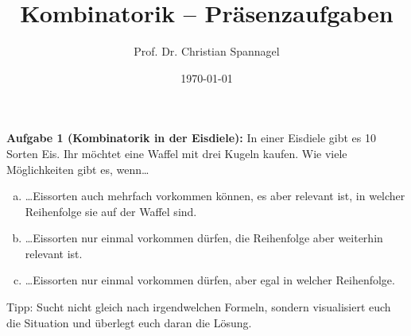 \documentclass{../cssheet}
\title{Kombinatorik -- Präsenzaufgaben}
\author{Prof. Dr. Christian Spannagel}
\date{\today}
\begin{document}
\printtitle

\vspace*{10mm}


\textbf{Aufgabe 1 (Kombinatorik in der Eisdiele):}  In einer Eisdiele gibt es 10 Sorten Eis. Ihr möchtet eine Waffel mit drei Kugeln kaufen. Wie viele Möglichkeiten gibt es, wenn\ldots
\begin{enumerate}[a)]
\item \ldots Eissorten auch mehrfach vorkommen können, es aber relevant ist, in welcher Reihenfolge sie auf der Waffel sind.
\item \ldots Eissorten nur einmal vorkommen dürfen, die Reihenfolge aber weiterhin relevant ist.
\item \ldots Eissorten nur einmal vorkommen dürfen, aber egal in welcher Reihenfolge.
\end{enumerate}
Tipp: Sucht nicht gleich nach irgendwelchen Formeln, sondern visualisiert euch die Situation und überlegt euch daran die Lösung.


\vspace*{3cm}

\printlicense

\printsocials
\end{document}
